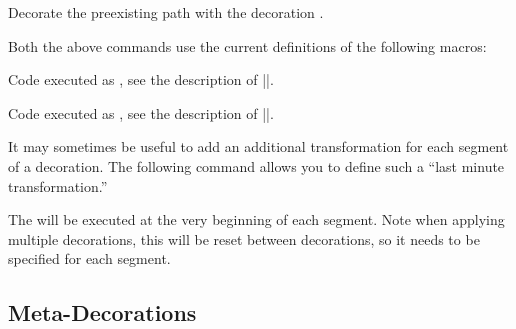 \begin{command}{\pgfdecoratecurrentpath{}}
  Decorate the preexisting path with the decoration .
\end{command}

Both the above commands use the current definitions of the following
macros:

\begin{command}{\pgfdecoratebeforecode}
  Code executed as , see the description of
  |\pgfdecorate|.
\end{command}

\begin{command}{\pgfdecorateaftercode}
  Code executed as , see the description of
  |\pgfdecorate|.
\end{command}

It may sometimes be useful to add an additional transformation
for each segment of a decoration. The following command allows
you to define such a ``last minute transformation.''

\begin{command}{\pgfsetdecorationsegmenttransformation{}}
  The  will be executed at the very beginning of each
  segment. Note when applying multiple decorations, this will
  be reset between decorations, so it needs to be specified for
  each segment.

\begin{codeexample}[]
\end{codeexample}
\end{command}




\subsection{Meta-Decorations}

